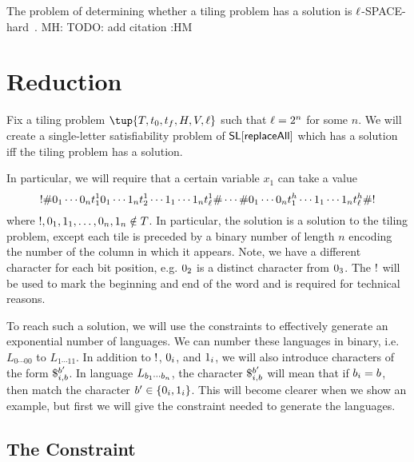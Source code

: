 \documentclass{article}
\newcommand{\mat}[1]{\color{cyan} {MH: #1 :HM} \color{black}}
\begin{document}
The problem of determining whether a tiling problem has a solution is $\width$-SPACE-hard~\cite{TODO}.
\mat{TODO: add citation}


\section{Reduction}

Fix a tiling problem
$\tup{\tiles, \inittile, \fintile, \hcons, \vcons, \width}$
such that
$\width = 2^n$
for some $n$.
We will create a single-letter satisfiability problem of $\strline[\replaceall]$ which has a solution iff the tiling problem has a solution.

In particular, we will require that a certain variable $x_1$ can take a value
\[
    \resetchar
    \rowdelim \nbit{1}{0} \cdots \nbit{n}{0} \tile^1_1
              \nbit{1}{0} \cdots \nbit{n}{1} \tile^1_2
              \cdots
              \nbit{1}{1} \cdots \nbit{n}{1} \tile^1_\width
    \rowdelim \cdots
    \rowdelim \nbit{1}{0} \cdots \nbit{n}{0} \tile^\height_1
              \cdots
              \nbit{1}{1} \cdots \nbit{n}{1} \tile^\height_\width
    \rowdelim
    \resetchar
\]
where
$\resetchar,
 \nbit{1}{0}, \nbit{1}{1},
 \ldots,
 \nbit{n}{0}, \nbit{n}{1} \notin \tiles$.
In particular, the solution is a solution to the tiling problem, except each tile is preceded by a binary number of length $n$ encoding the number of the column in which it appears.
Note, we have a different character for each bit position, e.g. $\nbit{2}{0}$ is a distinct character from $\nbit{3}{0}$.
The $\resetchar$ will be used to mark the beginning and end of the word and is required for technical reasons.

To reach such a solution, we will use the constraints to effectively generate an exponential number of languages.
We can number these languages in binary, i.e.\ $L_{0\cdots00}$ to $L_{1\cdots11}$.
In addition to $\resetchar$, $\nbit{i}{0}$, and $\nbit{i}{1}$, we will also introduce characters of the form
$\repl{i}{\bit}{\bit'}$.
In language
$L_{\bit_1\cdots\bit_n}$,
the character
$\repl{i}{\bit}{\bit'}$
will mean that if $\bit_i = \bit$, then match the character
$\bit' \in \set{\nbit{i}{0},\nbit{i}{1}}$.
This will become clearer when we show an example, but first we will give the constraint needed to generate the languages.

\subsection*{The Constraint}
\end{document}
